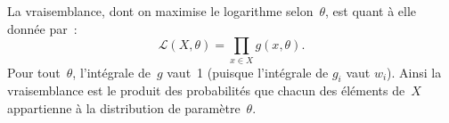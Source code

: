 \documentclass[main.tex]{subfiles}
\begin{document}


La vraisemblance, dont on maximise le logarithme selon~$\theta$, est quant à elle donnée par~:
\begin{equation}
\mathcal{L}(X,\theta) = \prod_{x \in X} g(x,\theta).
\end{equation}
Pour tout~$\theta$, l'intégrale de~$g$ vaut~1 (puisque l'intégrale de $g_i$ vaut $w_i$). 
Ainsi la vraisemblance est le produit des probabilités que chacun des éléments de~$X$ appartienne à la distribution de paramètre~$\theta$.
\end{document}
